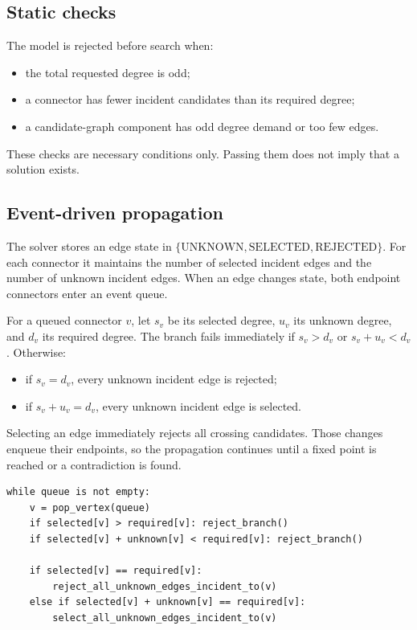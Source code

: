 \documentclass[11pt,a4paper]{article}
\begin{document}
\subsection{Static checks}

The model is rejected before search when:
\begin{itemize}
  \item the total requested degree is odd;
  \item a connector has fewer incident candidates than its required degree;
  \item a candidate-graph component has odd degree demand or too few edges.
\end{itemize}
These checks are necessary conditions only. Passing them does not imply that a
solution exists.

\subsection{Event-driven propagation}

The solver stores an edge state in $\{\mathrm{UNKNOWN},\mathrm{SELECTED},
\mathrm{REJECTED}\}$. For each connector it maintains the number of selected
incident edges and the number of unknown incident edges. When an edge changes
state, both endpoint connectors enter an event queue.

For a queued connector $v$, let $s_v$ be its selected degree, $u_v$ its unknown
degree, and $d_v$ its required degree. The branch fails immediately if
$s_v>d_v$ or $s_v+u_v<d_v$. Otherwise:
\begin{itemize}
  \item if $s_v=d_v$, every unknown incident edge is rejected;
  \item if $s_v+u_v=d_v$, every unknown incident edge is selected.
\end{itemize}
Selecting an edge immediately rejects all crossing candidates. Those changes
enqueue their endpoints, so the propagation continues until a fixed point is
reached or a contradiction is found.

\begin{lstlisting}[caption={Incremental propagation at one connector}]
while queue is not empty:
    v = pop_vertex(queue)
    if selected[v] > required[v]: reject_branch()
    if selected[v] + unknown[v] < required[v]: reject_branch()

    if selected[v] == required[v]:
        reject_all_unknown_edges_incident_to(v)
    else if selected[v] + unknown[v] == required[v]:
        select_all_unknown_edges_incident_to(v)
\end{lstlisting}
\end{document}
